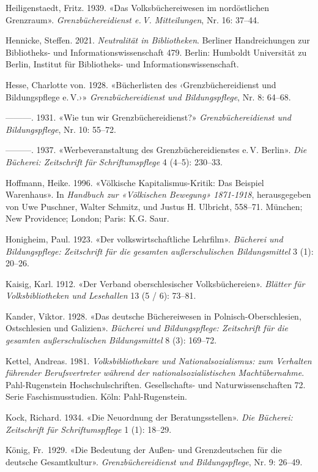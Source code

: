 \documentclass[a4paper,
fontsize=11pt,
oneside,
numbers=noperiodatend,
parskip=half-,
bibliography=totoc,
final
]{scrartcl}
\begin{document}
Heiligenstaedt, Fritz. 1939. «Das Volksbüchereiwesen im nordöstlichen
Grenzraum». \emph{Grenzbüchereidienst e.\,V. Mitteilungen}, Nr. 16:
37--44.

Hennicke, Steffen. 2021. \emph{Neutralität in Bibliotheken}. Berliner
Handreichungen zur Bibliotheks- und Informationswissenschaft 479.
Berlin: Humboldt Universität zu Berlin, Institut für Bibliotheks- und
Informationswissenschaft.

Hesse, Charlotte von. 1928. «Bücherlisten des ‹Grenzbüchereidienst und
Bildungspflege e.\,V.›» \emph{Grenzbüchereidienst und Bildungspflege}, Nr.
8: 64--68.

---------. 1931. «Wie tun wir Grenzbüchereidienst?»
\emph{Grenzbüchereidienst und Bildungspflege}, Nr. 10: 55--72.

---------. 1937. «Werbeveranstaltung des Grenzbüchereidienstes e.\,V.
Berlin». \emph{Die Bücherei: Zeitschrift für Schriftumspflege} 4 (4--5):
230--33.

Hoffmann, Heike. 1996. «Völkische Kapitalismus-Kritik: Das Beispiel
Warenhaus». In \emph{Handbuch zur «Völkischen Bewegung» 1871-1918},
herausgegeben von Uwe Puschner, Walter Schmitz, und Justus H. Ulbricht,
558--71. München; New Providence; London; Paris: K.G. Saur.

Honigheim, Paul. 1923. «Der volkswirtschaftliche Lehrfilm».
\emph{Bücherei und Bildungspflege: Zeitschrift für die gesamten
außerschulischen Bildungsmittel} 3 (1): 20--26.

Kaisig, Karl. 1912. «Der Verband oberschlesischer Volksbüchereien».
\emph{Blätter für Volksbibliotheken und Lesehallen} 13 (5 / 6): 73--81.

Kander, Viktor. 1928. «Das deutsche Büchereiwesen in
Polnisch-Oberschlesien, Ostschlesien und Galizien». \emph{Bücherei und
Bildungspflege: Zeitschrift für die gesamten außerschulischen
Bildungsmittel} 8 (3): 169--72.

Kettel, Andreas. 1981. \emph{Volksbibliothekare und Nationalsozialismus:
zum Verhalten führender Berufsvertreter während der
nationalsozialistischen Machtübernahme}. Pahl-Rugenstein
Hochschulschriften. Gesellschafts- und Naturwissenschaften 72. Serie
Faschismusstudien. Köln: Pahl-Rugenstein.

Kock, Richard. 1934. «Die Neuordnung der Beratungsstellen». \emph{Die
Bücherei: Zeitschrift für Schriftumspflege} 1 (1): 18--29.

König, Fr.~1929. «Die Bedeutung der Außen- und Grenzdeutschen für die
deutsche Gesamtkultur». \emph{Grenzbüchereidienst und Bildungspflege},
Nr. 9: 26--49.
\end{document}
